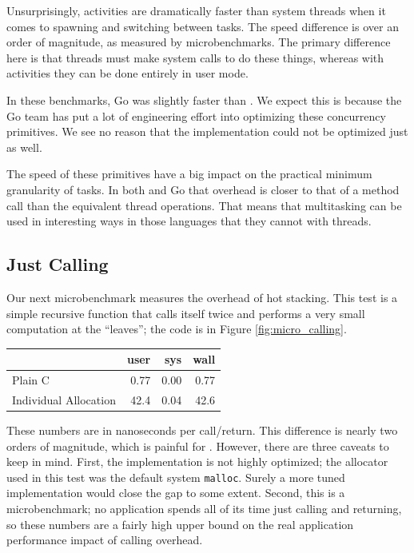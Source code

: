 \documentclass[acmsmall,anonymous,review]{acmart}\settopmatter{printfolios=true,printccs=false,printacmref=false}
\begin{document}
Unsurprisingly, activities are dramatically faster than system threads when it comes to spawning and switching between tasks.
The speed difference is over an order of magnitude, as measured by microbenchmarks.
The primary difference here is that threads must make system calls to do these things, whereas with activities they can be done entirely in user mode.

In these benchmarks, Go was slightly faster than \charcoal{}.
We expect this is because the Go team has put a lot of engineering effort into optimizing these concurrency primitives.
We see no reason that the \charcoal{} implementation could not be optimized just as well.

The speed of these primitives have a big impact on the practical minimum granularity of tasks.
In both \charcoal{} and Go that overhead is closer to that of a method call than the equivalent thread operations.
That means that multitasking can be used in interesting ways in those languages that they cannot with threads.

\subsection{Just Calling}

Our next microbenchmark measures the overhead of hot stacking.
This test is a simple recursive function that calls itself twice and performs a very small computation at the ``leaves''; the code is in Figure \ref{fig:micro_calling}.

\vspace{1em}
\begin{tabular}{|l|r|r|r|}
  \hline
   & user & sys & wall \\
  \hline
  \hline
  Plain C & 0.77 & 0.00 & 0.77 \\
  \hline
  Individual Allocation & 42.4 & 0.04 & 42.6 \\
  \hline
\end{tabular}
\vspace{1em}

These numbers are in nanoseconds per call/return.
This difference is nearly two orders of magnitude, which is painful for \charcoal{}.
However, there are three caveats to keep in mind.
First, the \charcoal{} implementation is not highly optimized; the allocator used in this test was the default system \texttt{malloc}.
Surely a more tuned implementation would close the gap to some extent.
Second, this is a microbenchmark; no application spends all of its time just calling and returning, so these numbers are a fairly high upper bound on the real application performance impact of calling overhead.
\end{document}
